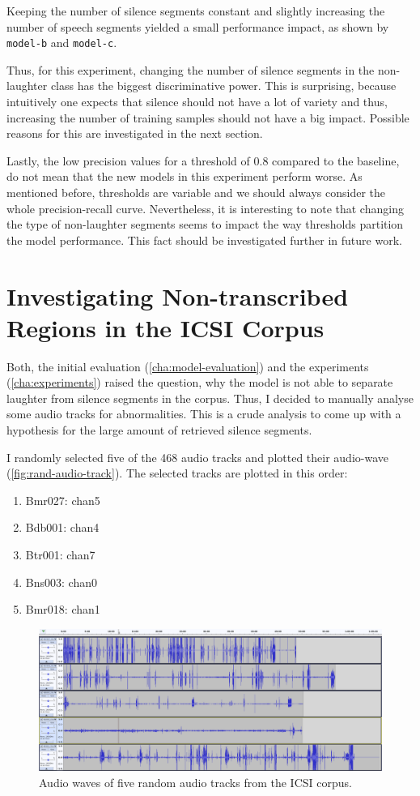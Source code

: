\documentclass[bsc,frontabs,parskip,deptreport]{infthesis}
\begin{document}
Keeping the number of silence segments constant and slightly increasing the number of speech segments yielded a small performance impact, as shown by \texttt{model-b} and \texttt{model-c}.

Thus, for this experiment, changing the number of silence segments in the non-laughter class has the biggest discriminative power. This is surprising, because intuitively one expects that silence should not have a lot of variety and thus, increasing the number of training samples should not have a big impact. Possible reasons for this are investigated in the next section.

Lastly, the low precision values for a threshold of 0.8 compared to the baseline, do not mean that the new models in this experiment perform worse. As mentioned before, thresholds are variable and we should always consider the whole precision-recall curve. Nevertheless, it is interesting to note that changing the type of non-laughter segments seems to impact the way thresholds partition the model performance. This fact should be investigated further in future work.

\section{Investigating Non-transcribed Regions in the ICSI Corpus} \label{sec:silence-regions}
Both, the initial evaluation (\autoref{cha:model-evaluation}) and the experiments (\autoref{cha:experiments}) raised the question, why the model is not able to separate laughter from silence segments in the corpus. Thus, I decided to manually analyse some audio tracks for abnormalities. This is a crude analysis to come up with a hypothesis for the large amount of retrieved silence segments.

I randomly selected five of the 468 audio tracks and plotted their audio-wave (\autoref{fig:rand-audio-track}). The selected tracks are plotted in this order:
\begin{enumerate}
    \item Bmr027: chan5
    \item Bdb001: chan4
    \item Btr001: chan7
    \item Bns003: chan0
    \item Bmr018: chan1
\end{enumerate}

\begin{figure}[h!]
    \centering
    \includegraphics[width=14cm]{imgs/audio_waves/plotted_audio_waves.png}
    \caption{Audio waves of five random audio tracks from the ICSI corpus.}
    \label{fig:rand-audio-track}
\end{figure}
\end{document}
